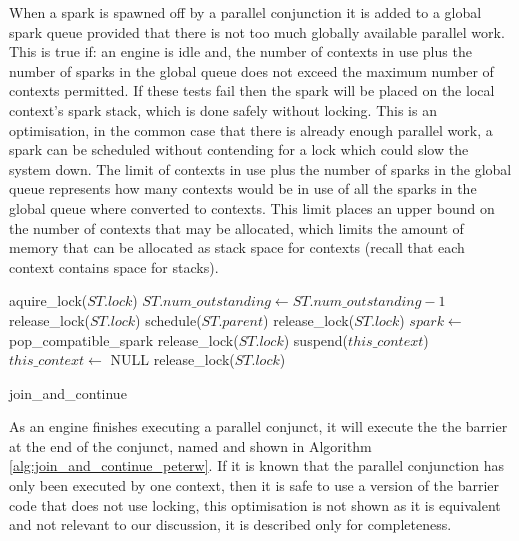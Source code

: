 When a spark is spawned off by a parallel conjunction
it is added to a global spark queue provided that there is not too much
globally available parallel work.
This is true if:
an engine is idle and,
the number of contexts in use plus the number of sparks in the global queue
does not exceed the maximum number of contexts permitted.
If these tests fail then the spark will be placed on the local context's
spark stack,
which is done safely without locking.
This is an optimisation,
in the common case that there is already enough parallel work,
a spark can be scheduled without contending for a lock which could slow the
system down.
The limit of contexts in use plus the number of sparks in the global queue
represents how many contexts would be in use of all the sparks in the global
queue where converted to contexts.
This limit places an upper bound on the number of contexts that may be
allocated,
which limits the amount of memory that can be allocated as stack space for
contexts
(recall that each context contains space for stacks).

\begin{algorithm}
\begin{algorithmic}
  \State aquire\_lock($ST.lock$)
  \State $ST.num\_outstanding \gets ST.num\_outstanding - 1$
      \State release\_lock($ST.lock$)
    \Else
      \State schedule($ST.parent$)
      \State release\_lock($ST.lock$)
    \EndIf
  \Else
    \State $spark \gets$ pop\_compatible\_spark
       \State release\_lock($ST.lock$)
    \Else
         \State suspend($this\_context$)
         \State $this\_context \gets$ NULL
      \EndIf
      \State release\_lock($ST.lock$)
    \EndIf
  \EndIf
\EndProcedure
\end{algorithmic}
\caption{join\_and\_continue}
\label{alg:join_and_continue_peterw}
\end{algorithm}

As an engine finishes executing a parallel conjunct,
it will execute the the barrier at the end of the conjunct,
named \joinandcontinue and shown in
Algorithm \ref{alg:join_and_continue_peterw}.
If it is known that the parallel conjunction has only been executed by
one context,
then it is safe to use a version of the barrier code that does not use
locking,
this optimisation is not shown as it is equivalent and not relevant to
our discussion,
it is described only for completeness.


